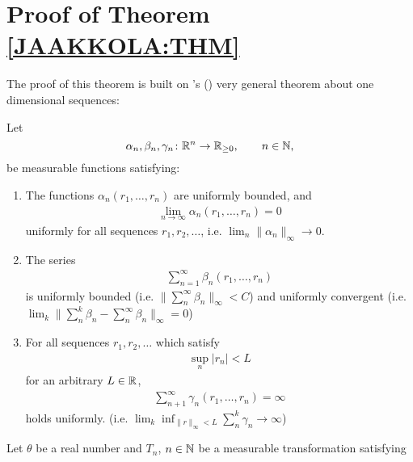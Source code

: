 \begin{corollary}
    
\end{corollary}

\section{Proof of Theorem \ref{JAAKKOLA:THM}}
The proof of this theorem is built on \citeauthor{dvoretzkyStochasticApproximation1956}'s (\citeyear{dvoretzkyStochasticApproximation1956}) very general theorem about one dimensional sequences:

\begin{thm}
    Let 
    \[
        \alpha_n, \beta_n,\gamma_n\colon \mathbb{R}^n \to \mathbb{R}_{\ge 0}, \qquad n\in\mathbb{N},
    \] 
    be measurable functions satisfying:
    \begin{enumerate}
        \item The functions \(\alpha_n(r_1,\dots,r_n) \) are uniformly bounded, and 
        \begin{align}\label{alpha_n property}
            \lim_{n\to\infty}\alpha_n(r_1,\dots,r_n)=0
        \end{align}
        uniformly for all sequences \(r_1,r_2,\dots\), i.e. \(\lim_n \|\alpha_n\|_\infty \to 0\).
        \item The series
        \begin{align}\label{beta_n property}
            \sum_{n=1}^\infty \beta_n(r_1,\dots, r_n)
        \end{align}
        is uniformly bounded (i.e. \(\|\sum_n^\infty \beta_n\|_\infty<C\)) and uniformly convergent (i.e. \(\lim_k\| \sum_n^k\beta_n -\sum^\infty_n\beta_n\|_\infty=0  \))
        \item For all sequences \(r_1,r_2,\dots \) which satisfy
        \begin{align}\label{sup r_n < L}
            \sup_n |r_n| < L
        \end{align}
        for an arbitrary \(L\in\mathbb{R}\),
        \begin{align}\label{gamma_n property}
            \sum_{n+1}^\infty \gamma_n(r_1,\dots,r_n)=\infty
        \end{align}
        holds uniformly. (i.e. \(\lim_k \inf_{\|r\|_\infty < L}  \sum^k_n \gamma_n \to \infty \))
    \end{enumerate}
    Let \(\theta\) be a real number and \(T_n\), \(n\in\mathbb{N}\) be a measurable transformation satisfying
    \begin{align}

\end{align}
\end{thm}
